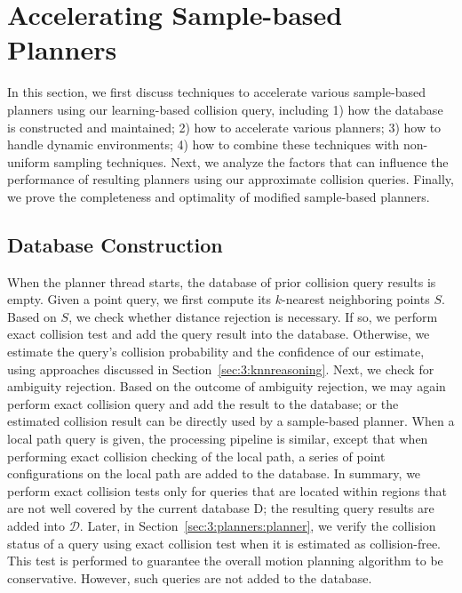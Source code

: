 %


\section{Accelerating Sample-based Planners}
\label{sec:3:planners}

In this section, we first discuss techniques to accelerate various sample-based planners using our learning-based collision query, including 1) how the database is constructed and maintained; 2) how to accelerate various planners; 3) how to handle dynamic environments; 4) how to combine these techniques with non-uniform sampling techniques.
Next, we analyze the factors that can influence the performance of resulting planners using our approximate collision queries. Finally, we prove the completeness and optimality of modified sample-based planners.

\subsection{Database Construction}
When the planner thread starts, the database of prior collision query results is empty. Given a point query, we first compute its $k$-nearest neighboring points $S$. Based on $S$, we check whether distance rejection is necessary. If so, we perform exact collision test and add the query result into the database. Otherwise, we estimate the query's collision probability and the confidence of our estimate, using approaches discussed in Section~\ref{sec:3:knnreasoning}. Next, we check for ambiguity rejection. Based on the outcome of ambiguity rejection, we may again perform exact collision query and add the result to the database; or the estimated collision result can be directly used by a sample-based planner. When a local path query is given, the processing pipeline is similar, except that when performing exact collision checking of the local path, a series of point configurations on the local path are added to the database. In summary, we perform exact collision tests only for queries that are located within regions that are not well covered by the current database D; the resulting query results are added into $\mathcal D$. Later, in Section~\ref{sec:3:planners:planner}, we verify the collision status of a query using exact collision test when it is estimated as collision-free. This test is performed to guarantee the overall motion planning algorithm to be conservative. However, such queries are not added to the database.

